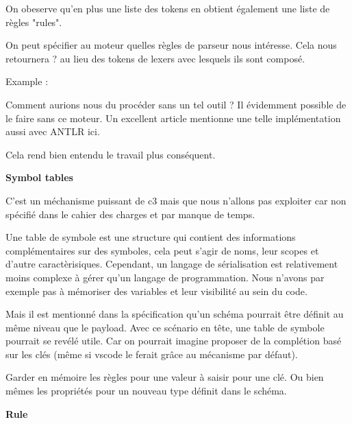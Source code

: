 \documentclass[
    iict, %
    il, %
]{heig-tb}
\begin{document}
On obeserve qu'en plus une liste des tokens en obtient également une liste de règles "rules".


On peut spécifier au moteur quelles règles de parseur nous intéresse. Cela nous retournera ? au lieu des tokens de lexers avec lesquels ils sont composé.

Example :


Comment aurions nous du procéder sans un tel outil ?
Il évidemment possible de le faire sans ce moteur. Un excellent article mentionne une telle implémentation aussi avec ANTLR ici.

Cela rend bien entendu le travail plus conséquent.



\textbf{Symbol tables}

C'est un méchanisme puissant de c3 mais que nous n'allons pas exploiter car non spécifié dans le cahier des charges et par manque de temps.

Une table de symbole est une structure qui contient des informations complémentaires sur des symboles, cela peut s'agir de noms, leur scopes et d'autre caractèrisiques.
Cependant, un langage de sérialisation est relativement moins complexe à gérer qu'un langage de programmation.
Nous n'avons par exemple pas à mémoriser des variables et leur visibilité au sein du code.

Mais il est mentionné dans la spécification qu'un schéma pourrait être définit au même niveau que le payload.
Avec ce scénario en tête, une table de symbole pourrait se revélé utile.
Car on pourrait imagine proposer de la complétion basé sur les clés (même si vscode le ferait grâce au mécanisme par défaut). %

Garder en mémoire les règles pour une valeur à saisir pour une clé.
Ou bien mêmes les propriétés pour un nouveau type définit dans le schéma.


\textbf{Rule}

\end{document}
